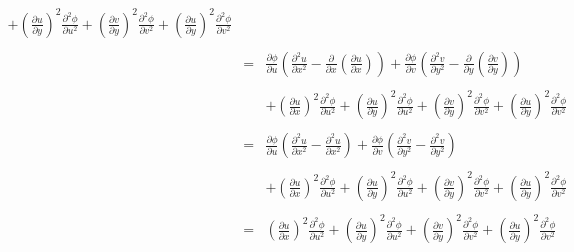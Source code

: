 \documentclass[10pt]{amsart}
\theoremstyle{nonumberplain}
\begin{document}
\begin{enumerate}[label={\bf {\arabic*}:}]
\begin{eqnarray*}
												        	 + \left(\frac{\partial u}{\partial y}\right)^2 \frac{\partial^2 \phi}{\partial u^2}
													 + \left(\frac{\partial v}{\partial y}\right)^2 \frac{\partial^2 \phi}{\partial v^2} 
													 + \left(\frac{\partial u}{\partial y}\right)^2\frac{\partial^2 \phi}{\partial v^2} \\ \\
												&=& \frac{\partial\phi}{\partial u} \left(\frac{\partial^2 u}{\partial x^2} - \frac{\partial}{\partial x} \left(\frac{\partial u}{\partial x} \right)\right)
													+ \frac{\partial\phi}{\partial v} \left(\frac{\partial^2 v}{\partial y^2} - \frac{\partial}{\partial y} \left(\frac{\partial v}{\partial y} \right) \right) \\ \\
												    && +  \left(\frac{\partial u}{\partial x}\right)^2 \frac{\partial^2 \phi}{\partial u^2}
												        	 + \left(\frac{\partial u}{\partial y}\right)^2 \frac{\partial^2 \phi}{\partial u^2}
													 + \left(\frac{\partial v}{\partial y}\right)^2 \frac{\partial^2 \phi}{\partial v^2} 
													 + \left(\frac{\partial u}{\partial y}\right)^2\frac{\partial^2 \phi}{\partial v^2} \\ \\
												&=& \frac{\partial\phi}{\partial u} \left(\frac{\partial^2 u}{\partial x^2} - \frac{\partial^2 u}{\partial x^2} \right)
													+ \frac{\partial\phi}{\partial v} \left(\frac{\partial^2 v}{\partial y^2} - \frac{\partial^2 v}{\partial y^2} \right) \\ \\
												    && +  \left(\frac{\partial u}{\partial x}\right)^2 \frac{\partial^2 \phi}{\partial u^2}
												        	 + \left(\frac{\partial u}{\partial y}\right)^2 \frac{\partial^2 \phi}{\partial u^2}
													 + \left(\frac{\partial v}{\partial y}\right)^2 \frac{\partial^2 \phi}{\partial v^2} 
													 + \left(\frac{\partial u}{\partial y}\right)^2\frac{\partial^2 \phi}{\partial v^2} \\ \\
												&=& \left(\frac{\partial u}{\partial x}\right)^2 \frac{\partial^2 \phi}{\partial u^2}
												        	 + \left(\frac{\partial u}{\partial y}\right)^2 \frac{\partial^2 \phi}{\partial u^2}
													 + \left(\frac{\partial v}{\partial y}\right)^2 \frac{\partial^2 \phi}{\partial v^2} 
													 + \left(\frac{\partial u}{\partial y}\right)^2\frac{\partial^2 \phi}{\partial v^2} \\ \\

\end{eqnarray*}
\end{enumerate}
\end{document}

